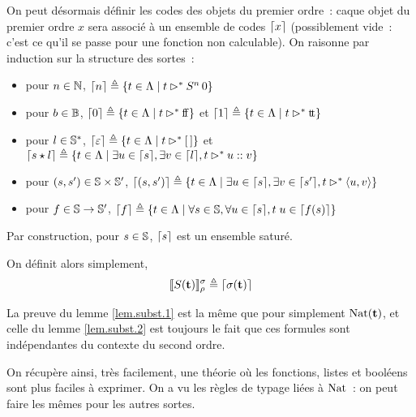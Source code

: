 \documentclass{article}
\begin{document}
On peut désormais définir les codes des objets du premier ordre~: caque objet du premier ordre $x$ sera associé à un ensemble de codes $\lceil x \rceil$ (possiblement vide~: c'est ce qu'il se passe pour une fonction non calculable). On raisonne par induction sur la structure des sortes~:
\begin{itemize}
    \item pour $n\in\mathbb{N}$, $\lceil n \rceil \triangleq \{t\in\Lambda \mid t \rhd^* S^n\,0\}$
    \item pour $b \in \mathbb{B}$, $\lceil 0 \rceil \triangleq \{t\in\Lambda\mid t \rhd^* \mathrm{f}\!\mathrm{f}\}$ et $\lceil 1 \rceil \triangleq \{t \in \Lambda\mid t \rhd^* \mathrm{t}\!\mathrm{t}\}$
    \item pour $l \in \mathbb{S}^*$, $\lceil \varepsilon \rceil \triangleq \{t\in\Lambda \mid t\rhd^* [\,]\}$ et $\lceil s\star l \rceil \triangleq \{t \in \Lambda\mid\exists u \in \lceil s \rceil,\exists v \in \lceil l \rceil,t \rhd^* u::v\}$
    \item pour $(s,s') \in \mathbb{S}\times \mathbb{S}'$, $\lceil (s,s') \rceil \triangleq \{t\in \Lambda\mid \exists u \in \lceil s \rceil, \exists v \in \lceil s' \rceil, t \rhd^* \langle u,v\rangle\}$
    \item pour $f \in \mathbb{S}\to \mathbb{S}'$, $\lceil f \rceil \triangleq \{t \in \Lambda\mid \forall s \in \mathbb{S}, \forall u \in \lceil s \rceil, t\;u \in \lceil f(s) \rceil\}$
\end{itemize}
Par construction, pour $s\in \mathbb{S}$, $\lceil s \rceil$ est un ensemble saturé.

On définit alors simplement, 
\[\llbracket S(\mathbf{t}) \rrbracket_\rho^\sigma\triangleq \lceil \sigma(\mathbf{t}) \rceil\]

La preuve du lemme \ref{lem.subst.1} est la même que pour simplement $\mathrm{Nat}(\mathbf{t})$, et celle du lemme \ref{lem.subst.2} est toujours le fait que ces formules sont indépendantes du contexte du second ordre.

On récupère ainsi, très facilement, une théorie où les fonctions, listes et booléens sont plus faciles à exprimer. On a vu les règles de typage liées à $\mathrm{Nat}$~: on peut faire les mêmes pour les autres sortes.
\end{document}
